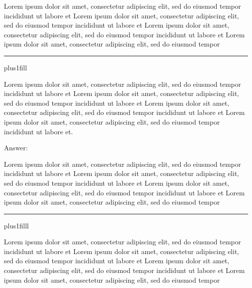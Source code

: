 
Lorem ipsum dolor sit amet, consectetur adipiscing elit, sed do eiusmod tempor
incididunt ut labore et Lorem ipsum dolor sit amet, consectetur adipiscing elit, sed do eiusmod tempor
incididunt ut labore et Lorem ipsum dolor sit amet, consectetur adipiscing elit, sed do eiusmod tempor
incididunt ut labore et Lorem ipsum dolor sit amet, consectetur adipiscing elit,
sed do eiusmod tempor \leaders\hrule\hskip10pt plus1fill

Lorem ipsum dolor sit amet, consectetur adipiscing elit, sed do eiusmod tempor
incididunt ut labore et Lorem ipsum dolor sit amet, consectetur adipiscing elit, sed do eiusmod tempor
incididunt ut labore et Lorem ipsum dolor sit amet, consectetur adipiscing elit, sed do eiusmod tempor
incididunt ut labore et Lorem ipsum dolor sit amet, consectetur adipiscing elit, sed do eiusmod tempor
incididunt ut labore et. 

Answer:


Lorem ipsum dolor sit amet, consectetur adipiscing elit, sed do eiusmod tempor
incididunt ut labore et Lorem ipsum dolor sit amet, consectetur adipiscing elit, sed do eiusmod tempor
incididunt ut labore et Lorem ipsum dolor sit amet, consectetur adipiscing elit, sed do eiusmod tempor
incididunt ut labore et Lorem ipsum dolor sit amet, consectetur adipiscing elit, sed do eiusmod tempor\null\nobreak\leaders\hrule\hskip10pt plus1filll\ \par
Lorem ipsum dolor sit amet, consectetur adipiscing elit, sed do eiusmod tempor
incididunt ut labore et Lorem ipsum dolor sit amet, consectetur adipiscing elit, sed do eiusmod tempor
incididunt ut labore et Lorem ipsum dolor sit amet, consectetur adipiscing elit, sed do eiusmod tempor
incididunt ut labore et Lorem ipsum dolor sit amet, consectetur adipiscing elit, sed do eiusmod tempor
 

\bye

